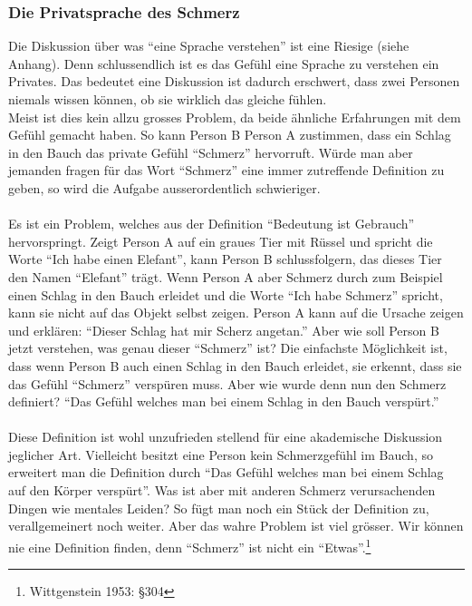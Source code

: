 \documentclass[a4paper,10pt]{article}
\begin{document}
\subsubsection{Die Privatsprache des Schmerz}
Die Diskussion über was \enquote{eine Sprache verstehen} ist eine Riesige (siehe Anhang).
Denn schlussendlich ist es das Gefühl eine Sprache zu verstehen ein Privates. Das bedeutet eine Diskussion ist dadurch erschwert, dass zwei Personen niemals wissen können, ob sie wirklich das gleiche fühlen. \\
Meist ist dies kein allzu grosses Problem, da beide ähnliche Erfahrungen mit dem Gefühl gemacht haben. So kann Person B Person A zustimmen, dass ein Schlag in den Bauch das private Gefühl \enquote{Schmerz} hervorruft. Würde man aber jemanden fragen für das Wort \enquote{Schmerz} eine immer zutreffende Definition zu geben, so wird die Aufgabe ausserordentlich schwieriger. \\
\\
Es ist ein Problem, welches aus der Definition \enquote{Bedeutung ist Gebrauch} hervorspringt. Zeigt Person A auf ein graues Tier mit Rüssel und spricht die Worte \enquote{Ich habe einen Elefant}, kann Person B schlussfolgern, das dieses Tier den Namen \enquote{Elefant} trägt. Wenn Person A aber Schmerz durch zum Beispiel einen Schlag in den Bauch erleidet und die Worte \enquote{Ich habe Schmerz} spricht, kann sie nicht auf das Objekt selbst zeigen. Person A kann auf die Ursache zeigen und erklären: \enquote{Dieser Schlag hat mir Scherz angetan.} Aber wie soll Person B jetzt verstehen, was genau dieser \enquote{Schmerz} ist? Die einfachste Möglichkeit ist, dass wenn Person B auch einen Schlag in den Bauch erleidet, sie erkennt, dass sie das Gefühl \enquote{Schmerz} verspüren muss. Aber wie wurde denn nun den Schmerz definiert? \enquote{Das Gefühl welches man bei einem Schlag in den Bauch verspürt.} \\
\\
Diese Definition ist wohl unzufrieden stellend für eine akademische Diskussion jeglicher Art. Vielleicht besitzt eine Person kein Schmerzgefühl im Bauch, so erweitert man die Definition durch \enquote{Das Gefühl welches man bei einem Schlag auf den Körper verspürt}. Was ist aber mit anderen Schmerz verursachenden Dingen wie mentales Leiden? So fügt man noch ein Stück der Definition zu, verallgemeinert noch weiter. Aber das wahre Problem ist viel grösser. Wir können nie eine Definition finden, denn \enquote{Schmerz} ist nicht ein \enquote{Etwas}.\footnote{Wittgenstein 1953: §304}
\end{document}
